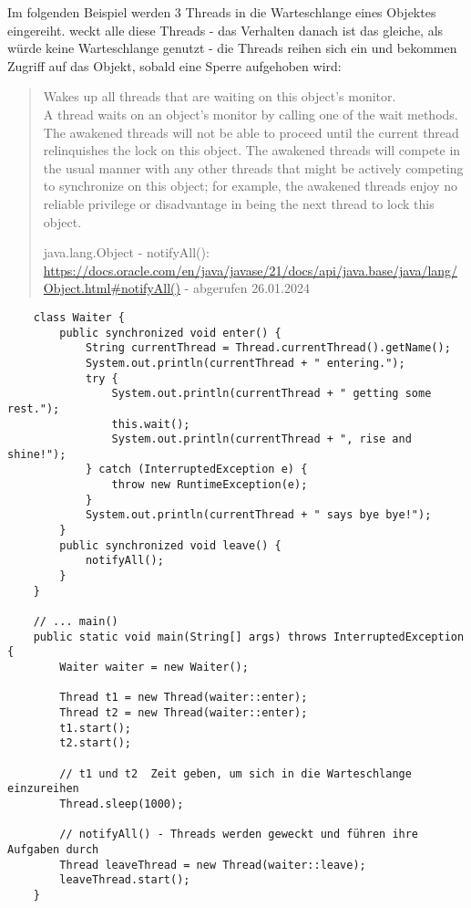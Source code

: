 \noindent
Im folgenden Beispiel werden 3 Threads in die Warteschlange eines Objektes eingereiht.  weckt alle diese Threads - das Verhalten danach ist das gleiche, als würde keine Warteschlange genutzt - die Threads reihen sich ein und bekommen Zugriff auf das Objekt, sobald eine Sperre aufgehoben wird:
\blockquote[{java.lang.Object - notifyAll(): \url{https://docs.oracle.com/en/java/javase/21/docs/api/java.base/java/lang/Object.html#notifyAll()} - abgerufen 26.01.2024}]{
    Wakes up all threads that are waiting on this object's monitor.\\ A thread waits on an object's monitor by calling one of the wait methods.
    The awakened threads will not be able to proceed until the current thread relinquishes the lock on this object. The awakened threads will compete in the usual manner with any other threads that might be actively competing to synchronize on this object; for example, the awakened threads enjoy no reliable privilege or disadvantage in being the next thread to lock this object.
}

\begin{verbatim}
    class Waiter {
        public synchronized void enter() {
            String currentThread = Thread.currentThread().getName();
            System.out.println(currentThread + " entering.");
            try {
                System.out.println(currentThread + " getting some rest.");
                this.wait();
                System.out.println(currentThread + ", rise and shine!");
            } catch (InterruptedException e) {
                throw new RuntimeException(e);
            }
            System.out.println(currentThread + " says bye bye!");
        }
        public synchronized void leave() {
            notifyAll();
        }
    }

    // ... main()
    public static void main(String[] args) throws InterruptedException {
        Waiter waiter = new Waiter();

        Thread t1 = new Thread(waiter::enter);
        Thread t2 = new Thread(waiter::enter);
        t1.start();
        t2.start();

        // t1 und t2  Zeit geben, um sich in die Warteschlange einzureihen
        Thread.sleep(1000);

        // notifyAll() - Threads werden geweckt und führen ihre Aufgaben durch
        Thread leaveThread = new Thread(waiter::leave);
        leaveThread.start();
    }
\end{verbatim}\\


